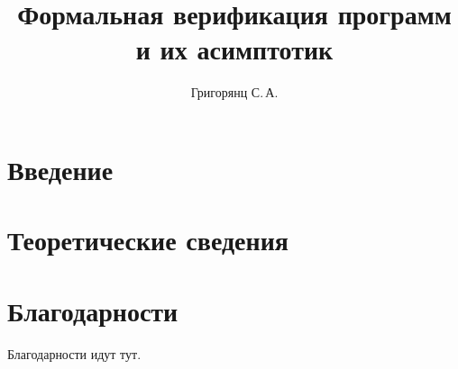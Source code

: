 \documentclass{mipt-thesis-bs}
\title{Формальная верификация программ и их асимптотик}
\author{Григорянц С.\,А.}
\begin{document}
\newtheorem{lemma}{Лемма}[section]
\newtheorem{corollary}{Следствие}[section]
\newtheorem{proposition}{Утверждение}[section]
\newtheorem{remark}{Замечание}[section]
\newtheorem{fact}{Факт}[section]
\newtheorem{example}{Пример}[section]
\newtheorem{definition}{Определение}[section]

{\topsep}{\topsep}%
{\itshape}{}%
{\bfseries}{}%
{\newline}{}%
\theoremstyle{break}
\newtheorem{theorem}{Теорема}[section]


\frontmatter
\titlecontents

\mainmatter


\chapter{Введение}


\chapter{Теоретические сведения}



\backmatter

\printbib

\chapter{Благодарности}

Благодарности идут тут.
\end{document}
